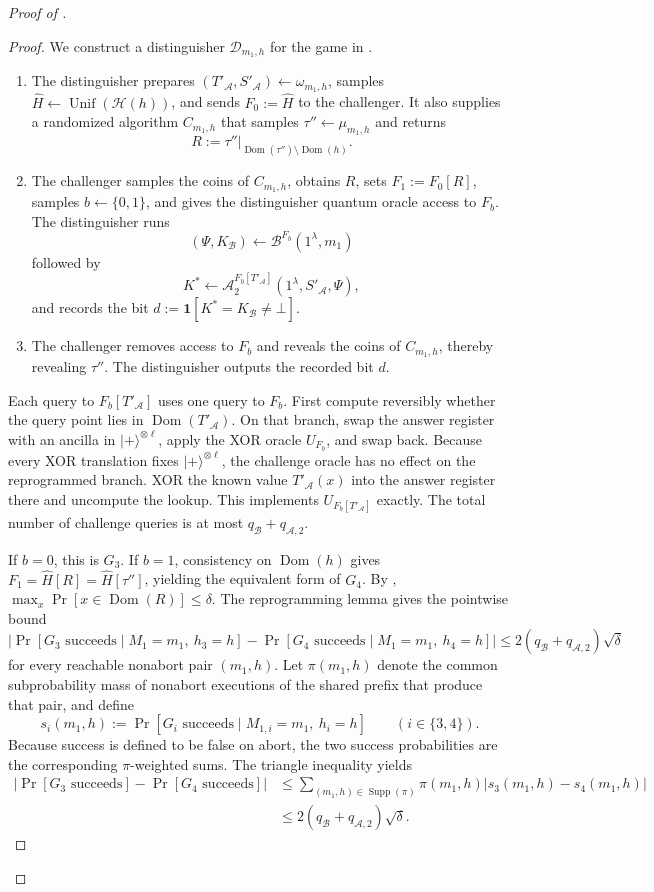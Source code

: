 \documentclass[11pt]{article}
\newcounter{algorithm}
\newcommand{\bits}{\{0,1\}}
\newcommand{\cA}{\mathcal{A}}
\newcommand{\cB}{\mathcal{B}}
\newcommand{\cD}{\mathcal{D}}
\newcommand{\cH}{\mathcal{H}}
\newcommand{\Dom}{\operatorname{Dom}}
\newcommand{\Unif}{\operatorname{Unif}}
\newcommand{\Supp}{\operatorname{Supp}}
\newcommand{\ket}[1]{\lvert #1\rangle}
\begin{document}
\begin{proof}[Proof of ]
\begin{proof}
We construct a distinguisher \(\cD_{m_1,h}\) for the game in
.
\begin{enumerate}[leftmargin=2em]
  \item The distinguisher prepares
  \((T'_{\cA},S'_{\cA})\leftarrow\omega_{m_1,h}\), samples
  \(\widehat H\leftarrow\Unif(\cH(h))\), and sends
  \(F_0:=\widehat H\) to the challenger. It also supplies a randomized
  algorithm \(C_{m_1,h}\) that samples
  \(\tau''\leftarrow\mu_{m_1,h}\) and returns
  \[
    R:=\tau''|_{\Dom(\tau'')\setminus\Dom(h)}.
  \]
  \item The challenger samples the coins of \(C_{m_1,h}\), obtains \(R\),
  sets \(F_1:=F_0[R]\), samples \(b\leftarrow\bits\), and gives the
  distinguisher quantum oracle access to \(F_b\). The distinguisher runs
  \[
    (\Psi,K_{\cB})\leftarrow\cB^{F_b}(1^\lambda,m_1)
  \]
  followed by
  \[
    K^*\leftarrow
    \cA_2^{F_b[T'_{\cA}]}
    (1^\lambda,S'_{\cA},\Psi),
  \]
  and records the bit \(d:=\mathbf 1[K^*=K_{\cB}\neq\bot]\).
  \item The challenger removes access to \(F_b\) and reveals the coins of
  \(C_{m_1,h}\), thereby revealing \(\tau''\). The distinguisher outputs
  the recorded bit \(d\).
\end{enumerate}

Each query to \(F_b[T'_{\cA}]\) uses one query to \(F_b\). First compute
reversibly whether the query point lies in \(\Dom(T'_{\cA})\). On that
branch, swap the answer register with an ancilla in
\(\ket{+}^{\otimes\ell}\), apply the XOR oracle \(U_{F_b}\), and swap back.
Because every XOR translation fixes \(\ket{+}^{\otimes\ell}\), the challenge
oracle has no effect on the reprogrammed branch.  XOR the known value
\(T'_{\cA}(x)\) into the answer register there and uncompute the lookup.  This
implements \(U_{F_b[T'_{\cA}]}\) exactly. The total number of challenge queries
is at most \(q_{\cB}+q_{\cA,2}\).

If \(b=0\), this is \(G_3\). If \(b=1\), consistency on
\(\Dom(h)\) gives \(F_1=\widehat H[R]=\widehat H[\tau'']\), yielding the
equivalent form of \(G_4\). By ,
\(\max_x\Pr[x\in\Dom(R)]\le\delta\). The reprogramming lemma gives the
pointwise bound
\[
  \left|
    \Pr[G_3\text{ succeeds}\mid M_1=m_1,\ h_3=h]
    -
    \Pr[G_4\text{ succeeds}\mid M_1=m_1,\ h_4=h]
  \right|
  \le 2(q_{\cB}+q_{\cA,2})\sqrt\delta
\]
for every reachable nonabort pair \((m_1,h)\). Let \(\pi(m_1,h)\) denote the
common subprobability mass of nonabort executions of the shared prefix that
produce that pair, and define
\[
  s_i(m_1,h)
  :=
  \Pr[G_i\text{ succeeds}\mid M_{1,i}=m_1,\ h_i=h]
  \qquad (i\in\{3,4\}).
\]
Because success is defined to be false on abort, the two success
probabilities are the corresponding \(\pi\)-weighted sums. The triangle
inequality yields
\[
  \begin{aligned}
  \left|\Pr[G_3\text{ succeeds}]-\Pr[G_4\text{ succeeds}]\right|
  &\le
  \sum_{(m_1,h)\in\Supp(\pi)}\pi(m_1,h)
    \left|s_3(m_1,h)-s_4(m_1,h)\right|\\
  &\le 2(q_{\cB}+q_{\cA,2})\sqrt\delta.
  \end{aligned}
\]
\end{proof}


\end{proof}
\end{document}

